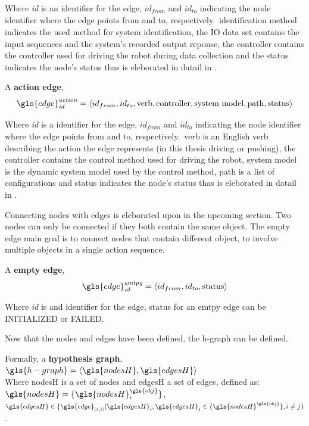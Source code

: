 Where \textit{id} is an identifier for the edge, $\mathit{id_{from}}$ and $\mathit{id_{to}}$ indicating the node identifier where the edge points from and to, respectively.~identification method indicates the used method for system identification, the \textrm{\ac{IO} data set} contains the input sequences and the system's recorded output reponse, the controller contains the controller used for driving the robot during data collection and the status indicates the node's status thas is eleborated in datail in .\bs

A \textbf{action edge}, \[\gls{edge}^\mathit{action}_\mathit{id} = \left\langle id_{from}, id_{to}, \textrm{verb}, \textrm{controller},\textrm{system model}, \textrm{path}, \textrm{status} \right\rangle\]\bs

Where \textit{id} is a identifier for the edge, $\mathit{id_{from}}$ and $\mathit{id_{to}}$ indicating the node identifier where the edge points from and to, respectively.~verb is an English verb describing the action the edge represents (in this thesis driving or pushing), the controller contains the control method used for driving the robot, system model is the dynamic system model used by the control method, path is a list of configurations and status indicates the node's status thas is eleborated in datail in .\bs

Connecting nodes with edges is eleborated upon in the upcoming section. Two nodes can only be connected if they both contain the same object. The empty edge main goal is to connect nodes that contain different object, to involve multiple objects in a single action sequence.\bs

A \textbf{empty edge}, \[\gls{edge}^\mathit{emtpy}_\mathit{id} = \left\langle id_{from}, id_{to}, \textrm{status} \right\rangle\]\bs

Where \textit{id} is and identifier for the edge, status for an emtpy edge can be INITIALIZED or FAILED.\bs

\noindent Now that the nodes and edges have been defined, the \ac{h-graph} can be defined.\bs

Formally, a \textbf{hypothesis graph}, $\gls{h-graph} = \left\langle \gls{nodesH}, \gls{edgesH} \right\rangle $
\\ Where \gls{nodesH} is a set of nodes and \gls{edgesH} a set of edges, defined as:\\ $\gls{nodesH} = \{\gls{nodesH}^{\gls{obj}}_{i}\}$, \quad $\gls{edgesH} \in \{\gls{edge}_{(i,j)}| \gls{edgesH}_i, \gls{edgesH}_j \in \{\gls{nodesH}^{\gls{obj}} \}, i \neq j\}$.\bs

